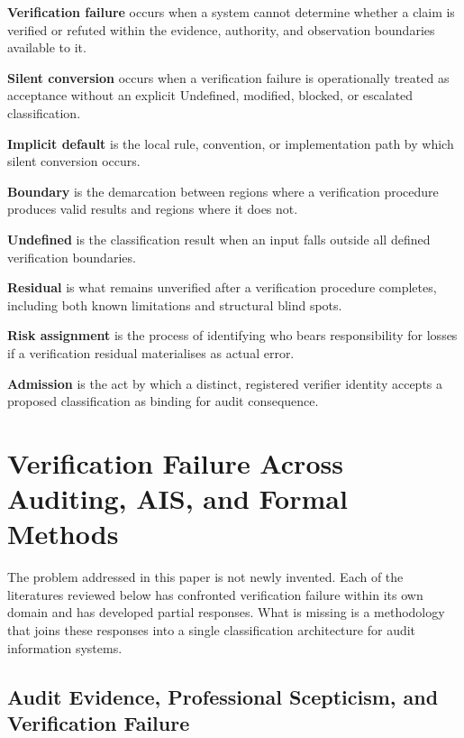 \documentclass[11pt,a4paper]{article}
\theoremstyle{definition}
\theoremstyle{remark}
\begin{document}
\begin{framed}
\noindent\textbf{Verification failure} occurs when a system cannot determine whether a claim is verified or refuted within the evidence, authority, and observation boundaries available to it.

\medskip
\noindent\textbf{Silent conversion} occurs when a verification failure is operationally treated as acceptance without an explicit \textsf{Undefined}, modified, blocked, or escalated classification.

\medskip
\noindent\textbf{Implicit default} is the local rule, convention, or implementation path by which silent conversion occurs.

\medskip
\noindent\textbf{Boundary} is the demarcation between regions where a verification procedure produces valid results and regions where it does not.

\medskip
\noindent\textbf{Undefined} is the classification result when an input falls outside all defined verification boundaries.

\medskip
\noindent\textbf{Residual} is what remains unverified after a verification procedure completes, including both known limitations and structural blind spots.

\medskip
\noindent\textbf{Risk assignment} is the process of identifying who bears responsibility for losses if a verification residual materialises as actual error.

\medskip
\noindent\textbf{Admission} is the act by which a distinct, registered verifier identity accepts a proposed classification as binding for audit consequence.
\end{framed}

\section{Verification Failure Across Auditing, AIS, and Formal Methods}
\label{sec:lit}

The problem addressed in this paper is not newly invented. Each of the literatures reviewed below has confronted verification failure within its own domain and has developed partial responses. What is missing is a methodology that joins these responses into a single classification architecture for audit information systems.

\subsection{Audit Evidence, Professional Scepticism, and Verification Failure}
\label{sec:lit-audit}
\end{document}
